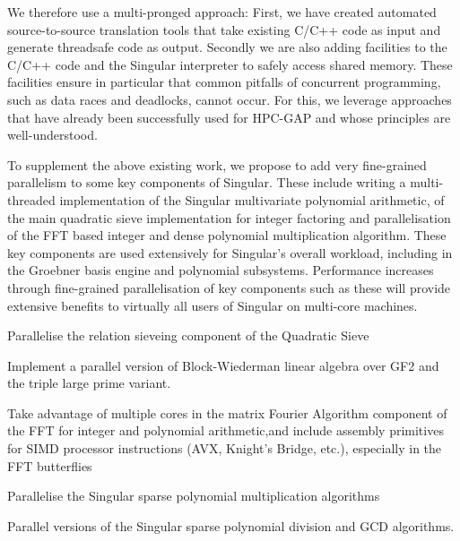 \begin{workpackage}[id=hpc,wphases=36-48,
  title=High Performance Computing,
  PSRM=1, %
  LLRM=12, %
  SARM=1, %
  UKRM=1, %
  UBRM=1, %
  UJFRM=12]
\begin{tasklist}
\begin{task}[title=Singular]
  We therefore use a multi-pronged approach: First, we have created automated
  source-to-source translation tools that take existing C/C++ code as input and generate
  threadsafe code as output. Secondly we are also adding facilities to the C/C++ code and
  the Singular interpreter to safely access shared memory. These facilities ensure in
  particular that common pitfalls of concurrent programming, such as data races and
  deadlocks, cannot occur. For this, we leverage approaches that have already been
  successfully used for HPC-GAP and whose principles are well-understood.

  To supplement the above existing work, we propose to add very fine-grained parallelism
  to some key components of Singular. These include writing a multi-threaded
  implementation of the Singular multivariate polynomial arithmetic, of the main quadratic
  sieve implementation for integer factoring and parallelisation of the FFT based integer
  and dense polynomial multiplication algorithm. These key components are used extensively
  for Singular's overall workload, including in the Groebner basis engine and polynomial
  subsystems. Performance increases through fine-grained parallelisation of key components
  such as these will provide extensive benefits to virtually all users of Singular on
  multi-core machines.
\end{task}
\end{tasklist}

\begin{wpdelivs}
  \begin{wpdeliv}[due=3,id=QS_sieving,dissem=??,nature=??]
      {Parallelise the relation sieveing component of the Quadratic Sieve}
\end{wpdeliv}
  \begin{wpdeliv}[due=9,id=QS_linalg,dissem=??,nature=??]
      {Implement a parallel version of Block-Wiederman linear algebra over GF2 and the triple large prime variant.}
\end{wpdeliv}
  \begin{wpdeliv}[due=12,id=FFT,dissem=??,nature=??]
    {Take advantage of multiple cores in the matrix Fourier Algorithm component of the FFT
      for integer and polynomial arithmetic,and include assembly primitives for SIMD
      processor instructions (AVX, Knight's Bridge, etc.), especially in the FFT
      butterflies}
\end{wpdeliv}
  \begin{wpdeliv}[due=12,id=singular_polymul,dissem=??,nature=??]
      {Parallelise the Singular sparse polynomial multiplication algorithms}
\end{wpdeliv}
  \begin{wpdeliv}[due=12,id=singular_polyarith,dissem=??,nature=??]
      {Parallel versions of the Singular sparse polynomial division and GCD algorithms.}
\end{wpdeliv}
\end{wpdelivs}


\end{workpackage}
